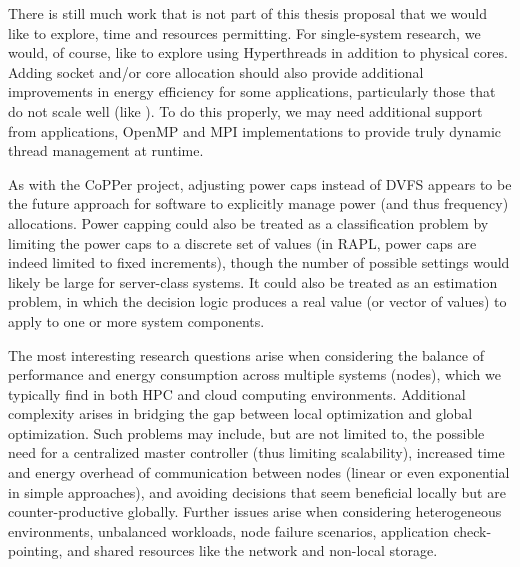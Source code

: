 There is still much work that is not part of this thesis proposal that we would like to explore, time and resources permitting.
For single-system research, we would, of course, like to explore using Hyperthreads in addition to physical cores.
Adding socket and/or core allocation should also provide additional improvements in energy efficiency for some applications, particularly those that do not scale well (like ).
To do this properly, we may need additional support from applications, OpenMP and MPI implementations to provide truly dynamic thread management at runtime.

As with the CoPPer project, adjusting power caps instead of DVFS appears to be the future approach for software to explicitly manage power (and thus frequency) allocations.
Power capping could also be treated as a classification problem by limiting the power caps to a discrete set of values (\eg in RAPL, power caps are indeed limited to fixed increments), though the number of possible settings would likely be large for server-class systems.
It could also be treated as an estimation problem, in which the decision logic produces a real value (or vector of values) to apply to one or more system components.

The most interesting research questions arise when considering the balance of performance and energy consumption across multiple systems (nodes), which we typically find in both HPC and cloud computing environments.
Additional complexity arises in bridging the gap between local optimization and global optimization.
Such problems may include, but are not limited to, the possible need for a centralized master controller (thus limiting scalability), increased time and energy overhead of communication between nodes (linear or even exponential in simple approaches), and avoiding decisions that seem beneficial locally but are counter-productive globally.
Further issues arise when considering heterogeneous environments, unbalanced workloads, node failure scenarios, application check-pointing, and shared resources like the network and non-local storage.
